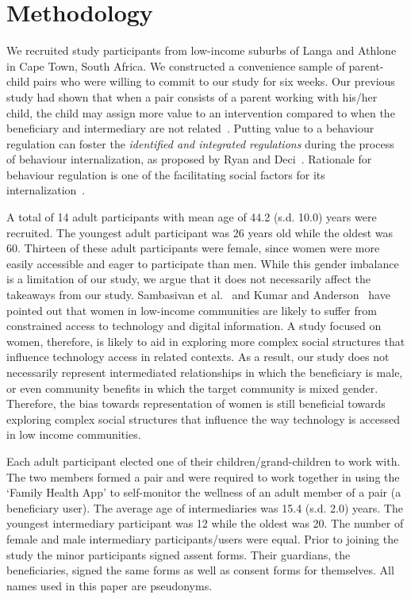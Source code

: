 \documentclass{sig-alternate}
\begin{document}
\section{Methodology}
We recruited study participants from low-income suburbs of Langa and Athlone in Cape Town, South Africa. We constructed a convenience sample of parent-child pairs who were willing to commit to our study for six weeks. Our previous study had shown that when a pair consists of a parent working with his/her child, the child may assign more value to an intervention compared to when the beneficiary and intermediary are not related~\cite{katule2016:leveraging}. Putting value to a behaviour regulation can foster the \emph{identified and integrated regulations} during the process of behaviour internalization, as proposed by Ryan and Deci~\cite{ryan2000intrinsic}. Rationale for behaviour regulation is one of the facilitating social factors for  its internalization~\cite{deci1994facilitating}.   

A total of 14 adult participants with mean age of 44.2 (s.d. 10.0) years were recruited.  The youngest adult participant was 26 years old while the oldest was 60. Thirteen of these adult participants were female, since women were more easily accessible and eager to participate than men. While this gender imbalance is a limitation of our study, we argue that it does not necessarily affect the takeaways from our study. Sambasivan et al.~\cite{sambasivan2010} and Kumar and Anderson~\cite{kumar2015mobile} have pointed out that women in low-income communities are likely to suffer from constrained access to technology and digital information. A study focused on women, therefore, is likely to aid in exploring more complex social structures that influence technology access in related contexts. As a result, our study does not necessarily represent intermediated relationships in which the beneficiary is male, or even community benefits in which the target community is mixed gender. Therefore, the bias towards representation of women is still beneficial towards exploring complex social structures that influence the way technology is accessed in low income communities.

Each adult participant elected one of their children/grand-children to work with. The two members formed a pair and were required to work together in using the `Family Health App' to self-monitor the wellness of an adult member of a pair (a beneficiary user). The average age of intermediaries was 15.4 (s.d. 2.0) years. The youngest intermediary participant was 12 while the oldest was 20. The number of female and male intermediary participants/users were equal. Prior to joining the study the minor participants signed assent forms. Their guardians, the beneficiaries, signed the same forms as well as consent forms for themselves. All names used in this paper are pseudonyms.
  
\end{document}
